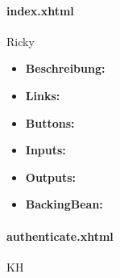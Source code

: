 				\paragraph{index.xhtml}
				Ricky
					\begin{itemize}
						\item \textbf{Beschreibung:}
						\item \textbf{Links:}
						\item \textbf{Buttons:}
						\item \textbf{Inputs:}
						\item \textbf{Outputs:}
						\item \textbf{BackingBean:}
					\end{itemize}
				
				\paragraph{authenticate.xhtml}
				KH\\
